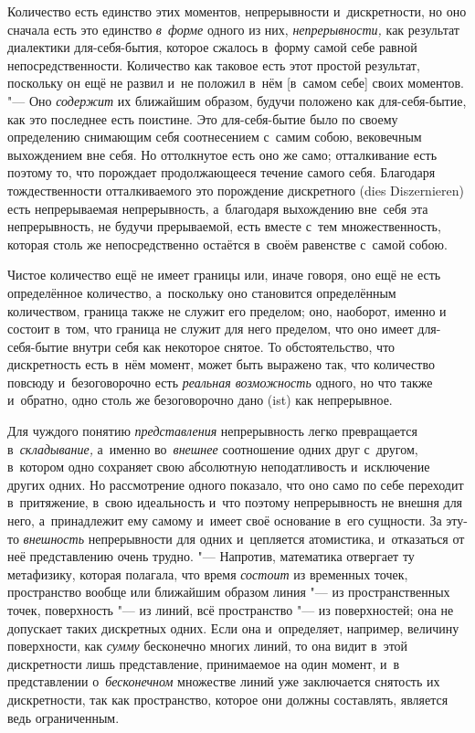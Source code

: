 Количество есть единство этих моментов, непрерывности и~дискретности, но оно
сначала есть это единство {\em в~форме} одного из них, {\em непрерывности,} как
результат диалектики для-себя-бытия, которое сжалось в~форму самой себе равной
непосредственности. Количество как таковое есть этот простой результат,
поскольку он ещё не развил и~не положил в~нём [в~самом себе] своих моментов.
"--- Оно {\em содержит} их ближайшим образом, будучи положено как
для-себя-бытие, как это последнее есть поистине. Это для-себя-бытие было по
своему определению снимающим себя соотнесением с~самим собою, вековечным
выхождением вне себя. Но оттолкнутое есть оно же само; отталкивание есть
поэтому то, что порождает продолжающееся течение самого себя. Благодаря
тождественности отталкиваемого это порождение дискретного (dies
Dis\-zer\-nie\-ren) есть непрерываемая непрерывность, а~благодаря выхождению
вне~себя эта непрерывность, не будучи прерываемой, есть вместе с~тем
множественность, которая столь же непосредственно остаётся в~своём равенстве
с~самой собою.


Чистое количество ещё не имеет границы или, иначе говоря, оно ещё не есть
определённое количество, а~поскольку оно становится определённым
количеством, граница также не служит его пределом; оно, наоборот, именно и
состоит в~том, что граница не служит для него пределом, что оно имеет
для-себя-бытие внутри себя как некоторое снятое. То обстоятельство, что
дискретность есть в~нём момент, может быть выражено так, что количество
повсюду и~безоговорочно есть {\em реальная возможность} одного, но
что также и~обратно, одно столь же безоговорочно дано (ist) как непрерывное.

Для чуждого понятию {\em представления} непрерывность легко превращается
в~{\em складывание,} а~именно во~{\em внешнее} соотношение одних друг с~другом,
в~котором одно сохраняет свою абсолютную неподатливость и~исключение других
одних. Но рассмотрение одного показало, что оно само по себе переходит
в~притяжение, в~свою идеальность и~что поэтому непрерывность не внешня для
него, а~принадлежит ему самому и~имеет своё основание в~его сущности. За эту-то
{\em внешность} непрерывности для одних и~цепляется атомистика, и~отказаться от
неё представлению очень трудно. "--- Напротив, математика отвергает ту
метафизику, которая полагала, что время {\em состоит} из временных точек,
пространство вообще или ближайшим образом линия "--- из пространственных точек,
поверхность "--- из линий, всё пространство "--- из поверхностей; она не
допускает таких дискретных одних. Если она и~определяет, например, величину
поверхности, как {\em сумму} бесконечно многих линий, то она видит в~этой
дискретности лишь представление, принимаемое на один момент, и~в представлении
о~{\em бесконечном} множестве линий уже заключается снятость их дискретности,
так как пространство, которое они должны составлять, является ведь
ограниченным.

